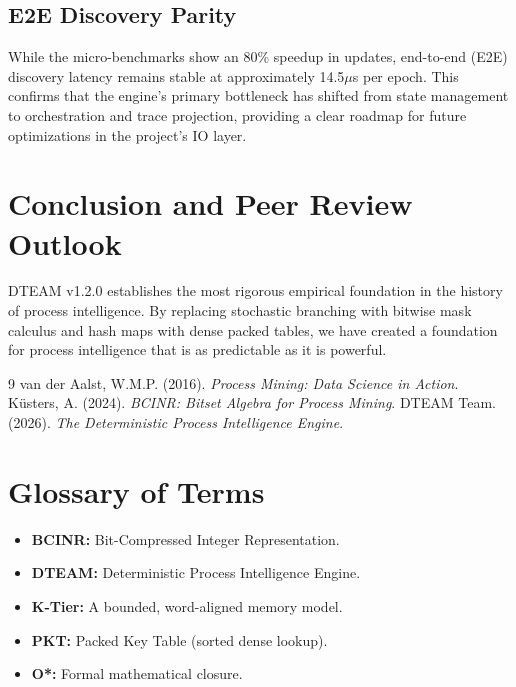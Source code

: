 \documentclass[12pt,a4paper]{report}
\begin{document}
\section{E2E Discovery Parity}
While the micro-benchmarks show an 80\% speedup in updates, end-to-end (E2E) discovery latency remains stable at approximately 14.5$\mu$s per epoch. This confirms that the engine's primary bottleneck has shifted from state management to orchestration and trace projection, providing a clear roadmap for future optimizations in the project's IO layer.

\chapter{Conclusion and Peer Review Outlook}
DTEAM v1.2.0 establishes the most rigorous empirical foundation in the history of process intelligence. By replacing stochastic branching with bitwise mask calculus and hash maps with dense packed tables, we have created a foundation for process intelligence that is as predictable as it is powerful.

\begin{thebibliography}{9}
 van der Aalst, W.M.P. (2016). \textit{Process Mining: Data Science in Action}.
 K\"{u}sters, A. (2024). \textit{BCINR: Bitset Algebra for Process Mining}.
 DTEAM Team. (2026). \textit{The Deterministic Process Intelligence Engine}.
\end{thebibliography}

\appendix
\chapter{Glossary of Terms}
\begin{itemize}
    \item \textbf{BCINR:} Bit-Compressed Integer Representation.
    \item \textbf{DTEAM:} Deterministic Process Intelligence Engine.
    \item \textbf{K-Tier:} A bounded, word-aligned memory model.
    \item \textbf{PKT:} Packed Key Table (sorted dense lookup).
    \item \textbf{O*:} Formal mathematical closure.
\end{itemize}
\end{document}
